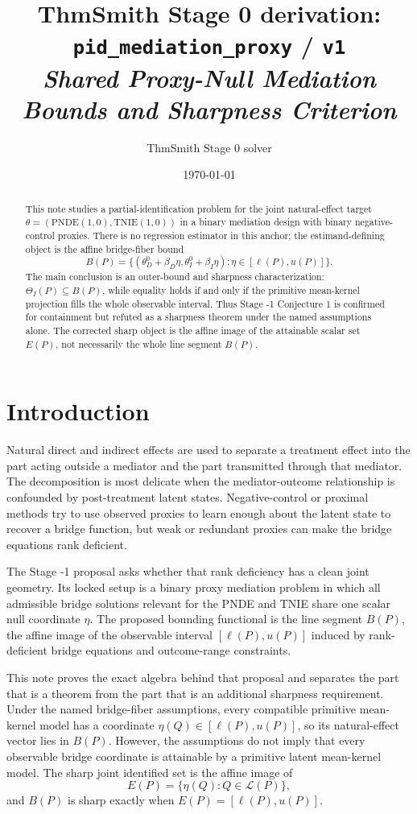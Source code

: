 \documentclass[11pt]{article}
\title{ThmSmith Stage 0 derivation: \texttt{pid\_mediation\_proxy} / \texttt{v1}%
  \\ \large\textit{Shared Proxy-Null Mediation Bounds and Sharpness Criterion}}
\author{ThmSmith Stage 0 solver}
\date{\today}
\theoremstyle{definition}
\theoremstyle{plain}
\theoremstyle{remark}
\begin{document}
\maketitle


\begin{abstract}
This note studies a partial-identification problem for the joint natural-effect
target \(\theta=(\mathrm{PNDE}(1,0),\mathrm{TNIE}(1,0))\) in a binary mediation
design with binary negative-control proxies.  There is no regression estimator
in this anchor; the estimand-defining object is the affine bridge-fiber bound
\[
  B(P)=\{(\theta_D^0+\beta_D\eta,\theta_I^0+\beta_I\eta):
       \eta\in[\ell(P),u(P)]\}.
\]
The main conclusion is an outer-bound and sharpness characterization:
\(\Theta_I(P)\subseteq B(P)\), while equality holds if and only if the primitive
mean-kernel projection fills the whole observable interval.  Thus Stage -1
Conjecture 1 is confirmed for containment but refuted as a sharpness theorem
under the named assumptions alone.  The corrected sharp object is the affine
image of the attainable scalar set \(E(P)\), not necessarily the whole line
segment \(B(P)\).
\end{abstract}

\section{Introduction}
Natural direct and indirect effects are used to separate a treatment effect into
the part acting outside a mediator and the part transmitted through that
mediator.  The decomposition is most delicate when the mediator-outcome
relationship is confounded by post-treatment latent states.  Negative-control
or proximal methods try to use observed proxies to learn enough about the latent
state to recover a bridge function, but weak or redundant proxies can make the
bridge equations rank deficient.

The Stage -1 proposal asks whether that rank deficiency has a clean joint
geometry.  Its locked setup is a binary proxy mediation problem in which all
admissible bridge solutions relevant for the PNDE and TNIE share one scalar
null coordinate \(\eta\).  The proposed bounding functional is the line segment
\(B(P)\), the affine image of the observable interval \([\ell(P),u(P)]\) induced
by rank-deficient bridge equations and outcome-range constraints.

This note proves the exact algebra behind that proposal and separates the part
that is a theorem from the part that is an additional sharpness requirement.
Under the named bridge-fiber assumptions, every compatible primitive
mean-kernel model has a coordinate \(\eta(Q)\in[\ell(P),u(P)]\), so its
natural-effect vector lies in \(B(P)\).  However, the assumptions do not imply
that every observable bridge coordinate is attainable by a primitive latent
mean-kernel model.  The sharp joint identified set is the affine image of
\[
  E(P)=\{\eta(Q):Q\in\mathcal L(P)\},
\]
and \(B(P)\) is sharp exactly when \(E(P)=[\ell(P),u(P)]\).
\end{document}
